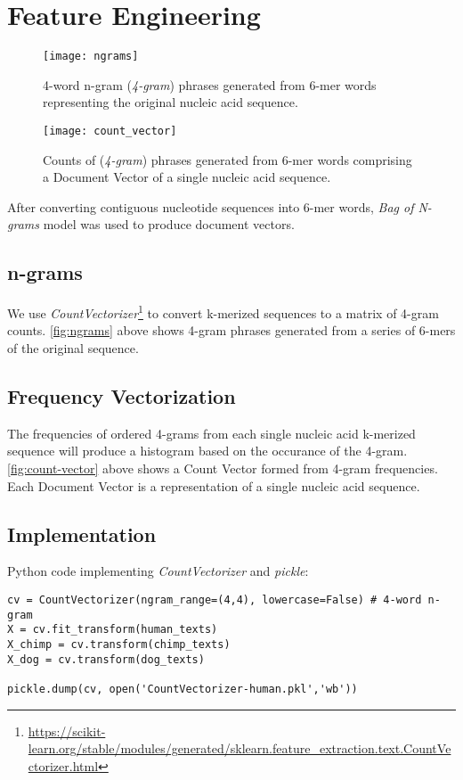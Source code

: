 \section{Feature Engineering}
%
  \begin{figure}
    \centering
    \texttt{[image: ngrams]}
    \caption{%
       4-word n-gram (\textit{4-gram}) phrases generated from 6-mer words representing the original nucleic acid sequence.
    }
    \label{fig:ngrams}
  \end{figure}
%
  \begin{figure}
    \centering
    \texttt{[image: count\_vector]}
    \caption{%
       Counts of (\textit{4-gram}) phrases generated from 6-mer words comprising a Document Vector of a single nucleic acid sequence.
    }
    \label{fig:count-vector}
  \end{figure}
%

After converting contiguous nucleotide sequences into 6-mer words, \textit{Bag of N-grams} model was used to produce document vectors.


\subsection{n-grams}

We use \textit{CountVectorizer}\footnote{\url{https://scikit-learn.org/stable/modules/generated/sklearn.feature_extraction.text.CountVectorizer.html}} to convert k-merized sequences to a matrix of 4-gram counts.
\autoref{fig:ngrams} above shows 4-gram phrases generated from a series of 6-mers of the original sequence. 
%
\subsection{Frequency Vectorization}
The frequencies of ordered 4-grams from each single nucleic acid k-merized sequence will produce a histogram based on the occurance of the 4-gram.
\autoref{fig:count-vector} above shows a Count Vector formed from 4-gram frequencies. Each Document Vector is a representation of a single nucleic acid sequence.
%

\subsection{Implementation}
Python code implementing \textit{CountVectorizer} and \textit{pickle}:
\begin{verbatim}
cv = CountVectorizer(ngram_range=(4,4), lowercase=False) # 4-word n-gram
X = cv.fit_transform(human_texts)
X_chimp = cv.transform(chimp_texts)
X_dog = cv.transform(dog_texts)

pickle.dump(cv, open('CountVectorizer-human.pkl','wb'))
\end{verbatim}
%
